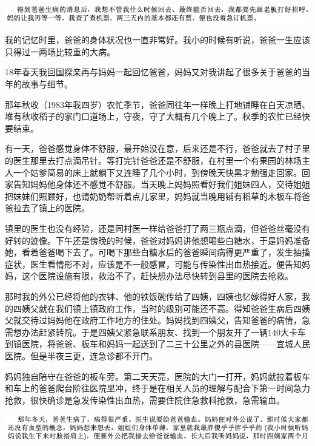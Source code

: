 \documentclass[9pt, b5paper]{article}
\begin{document}
\begin{center}
\includegraphics[width=.9\linewidth]{./pic/backups_plans_20210416_160907.png}
\end{center}

我的记忆时里，爸爸的身体状况也一直非常好。我小的时候有听说，爸爸一生应该只得过一两场比较重的大病。

18年春天我回国探亲再与妈妈一起回忆爸爸，妈妈又对我讲起了很多关于爸爸的当年的故事与细节。 

那年秋收（1983年我四岁）农忙季节，爸爸同往年一样晚上打地铺睡在白天凉晒、堆有秋收稻子的家门口道场上，守夜，守了大概有几个晚上了。秋季的农忙已经快要结束。

有一天，爸爸感觉身体不舒服，最开始没在意，后来还是不行，爸爸就去了村子里的医生那里去打点滴吊针。等打完针爸爸还是不舒服，在村里一个有果园的林场主人一个姑爹简易的床上就躺下又连睡了几个小时，到傍晚天快黑才勉强走回家。回家告知妈妈他身体还不感觉不舒服。当天晚上妈妈照看好我们姐妹四人，交待姐姐把妹妹们照顾好，也请奶奶帮听着点儿家里，妈妈就当晚用铺有稻草的木板车将爸爸拉去了镇上的医院。

镇里的医生也没有经验，还是同村医一样给爸爸打了两三瓶点滴，但爸爸丝毫没有好转的迹像。下午还是傍晚的时候，爸爸对妈妈讲他想喝些白糖水，于是妈妈准备她，看着爸爸喝下去了。可喝下那些白糖水后的爸爸瞬间病得更严重了，发生抽搐症状，医生看情形不对，应该是不一般感冒，可能与传染性出血热接近。便告知妈妈，这个医院设施有限，救治不了，赶快想办法尽快转到县里的医院去抢救。

那时我的外公已经将他的衣钵、他的铁饭碗传给了四姨，四姨也忆嫁得好人家，我的四姨父就在我们镇上镇政府工作，当时的级别可能还不高。得知爸爸生病后四姨父就交待过妈妈他在政府工作地方的住处。妈妈找到四姨父，告知爸爸的病情，急需想办法赶紧转院。于是四姨父紧急联系朋友、找到一个朋友开了一辆140大卡车到镇医院，将爸爸、板车和妈妈一起送到了二三十公里之外的县医院——宜城人民医院。但是半夜三更，连急诊都不开门。 

妈妈独自陪守在爸爸的板车旁。第二天天亮，医院的大门一打开，妈妈就拉着板车和车上的爸爸爬台阶往医院里冲，终于是在相关人员的理解与配合下第一时间急力抢救，很快确诊是急发传染性出血热，需要住院住急救科抢救，急需输血。

\begin{center}
\includegraphics[width=.9\linewidth]{./pic/backups_plans_20210417_104907.png}
\end{center}
\end{document}
